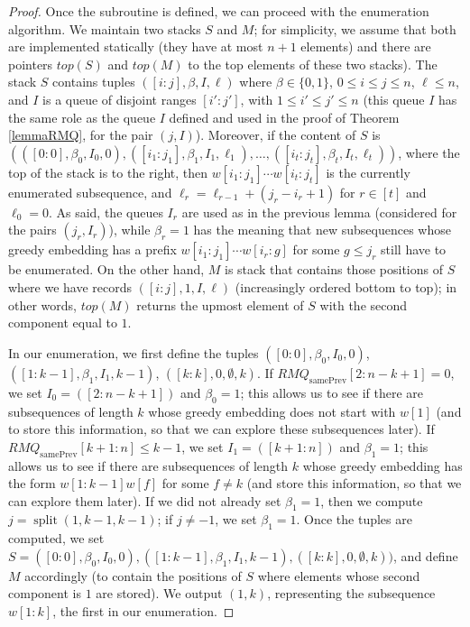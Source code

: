\documentclass[runningheads,UKenglish,cleveref, autoref, thm-restate]{llncs}
\DeclareMathOperator{\splitt}{split}
\DeclareMathOperator{\prevArray}{samePrev}
\begin{document}
\begin{proof}
Once the subroutine is defined, we can proceed with the enumeration algorithm. We maintain two stacks $S$ and $M$; for simplicity, we assume that both are implemented statically (they have at most $n+1$ elements) and there are pointers $top(S)$ and $top(M)$ to the top elements of these two stacks). The stack $S$ contains tuples $([i:j], \beta, I, \ell)$ where $\beta\in \{0,1\}$, $0\leq i\leq j\leq n$, $\ell\leq n$, and $I$ is a queue of disjoint ranges $[i':j']$, with $1\leq i'\leq j'\leq n$ (this queue $I$ has the same role as the queue $I$ defined and used in the proof of Theorem \ref{lemmaRMQ}, for the pair $(j,I)$). Moreover, if the content of $S$ is $(([0:0], \beta_0, I_0, 0), ([i_1:j_1], \beta_1, I_1, \ell_1), \ldots, ([i_t:j_t], \beta_t, I_t, \ell_t))$, where the top of the stack is to the right, then $w[i_1:j_1]\cdots w[i_t:j_t]$ is the currently enumerated subsequence, and $\ell_r=\ell_{r-1}+(j_r-i_r+1)$ for $r\in [t]$ and $\ell_0=0$. As said, the queues $I_r$ are used as in the previous lemma (considered for the pairs $(j_r,I_r)$), while $\beta_r=1$ has the meaning that new subsequences whose greedy embedding has a  prefix $w[i_1:j_1]\cdots w[i_r:g]$ for some $g\leq j_r$ still have to be enumerated. On the other hand, $M$ is stack that contains those positions of $S$ where we have records $([i:j], 1, I, \ell)$ (increasingly ordered bottom to top); in other words, $top(M)$ returns the upmost element of $S$ with the second component equal to $1$. 

In our enumeration, we first define the tuples $([0:0], \beta_0, I_0, 0)$, $([1:k-1], \beta_1, I_1, k-1)$, $([k:k], 0, \emptyset, k)$. If $RMQ_{\prevArray}[2:n-k+1]= 0$, we set $I_0=([2:n-k+1])$ and $\beta_0=1$; this allows us to see if there are subsequences of length $k$ whose greedy embedding does not start with $w[1]$ (and to store this information, so that we can explore these subsequences later). If $RMQ_{\prevArray}[k+1:n]\leq k-1$, we set $I_1=([k+1:n])$ and $\beta_1=1$; this allows us to see if there are subsequences of length $k$ whose greedy embedding has the form $w[1:k-1]w[f]$ for some $f\neq k$ (and store this information, so that we can explore them later). If we did not already set $\beta_1=1$, then we compute $j=\splitt(1,k-1,k-1)$; if $j\neq -1$, we set $\beta_1=1$. Once the tuples are computed, we set $S=([0:0], \beta_0, I_0, 0), ([1:k-1], \beta_1, I_1, k-1), ([k:k], 0, \emptyset, k))$, and define $M$ accordingly (to contain the positions of $S$ where elements whose second component is $1$ are stored). We output $(1,k)$, representing the subsequence $w[1:k]$, the first in our enumeration. 


\end{proof}
\end{document}

